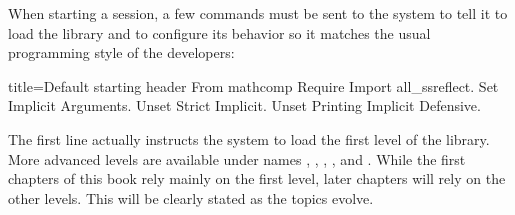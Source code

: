 When starting a \Coq{} session, a few commands must be sent to the \Coq{}
system to tell it to load the \mcbMC{} library and to configure its behavior
so it matches the usual programming style of the \mcbMC{} developers:

\begin{coq}{}{title={Default starting header}}
From mathcomp Require Import all_ssreflect.
Set Implicit Arguments.
Unset Strict Implicit.
Unset Printing Implicit Defensive.
\end{coq}
The first line actually instructs the \Coq{} system to load the first level
of the \mcbMC{} library.  More advanced levels are available under names
, , , ,
and .  While the first chapters of this book
rely mainly on the first
level, later chapters will rely on the other levels.  This will be clearly
stated as the topics evolve.
